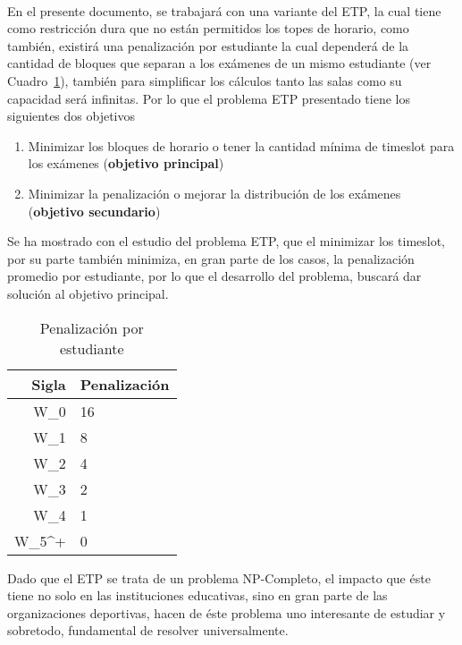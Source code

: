 \documentclass[letter, 10pt]{article}
\begin{document}
\begin{itemize}
\end{itemize}
\\
En el presente documento, se trabajará con una variante del ETP, la cual tiene como restricción dura que no están permitidos los topes de horario, como también, existirá una penalización por estudiante la cual dependerá de la cantidad de bloques que separan a los exámenes de un mismo estudiante (ver Cuadro~\ref{tab:Penalizaciones}), también para simplificar los cálculos tanto las salas como su capacidad será infinitas. Por lo que el problema ETP presentado tiene los siguientes dos objetivos
\begin{center}
    \begin{enumerate}
    \item Minimizar los bloques de horario o tener la cantidad mínima de timeslot para los exámenes (\textbf{objetivo principal})
    \item Minimizar la penalización o mejorar la distribución de los exámenes (\textbf{objetivo secundario})
\end{enumerate}
\end{center}

Se ha mostrado con el estudio del problema ETP, que el minimizar los timeslot, por su parte también minimiza, en gran parte de los casos, la penalización promedio por estudiante, por lo que el desarrollo del problema, buscará dar solución al objetivo principal.

\begin{table}[]
    \begin{center}
        \begin{tabular}{| r | l| }
        \hline
        \textbf{Sigla} & \textbf{Penalización} \\ \hline \hline
        W_0 & 16  \\ \hline
        W_1 & 8  \\ \hline
        W_2 & 4  \\ \hline
        W_3 & 2  \\ \hline
        W_4 & 1  \\ \hline
        W_5^+ & 0  \\ \hline
        \end{tabular}
        \caption{Penalización por estudiante \cite{Cita1}}
        \label{tab:Penalizaciones}
    \end{center}
\end{table}

\vspace{2mm}
Dado que el ETP se trata de un problema NP-Completo, el impacto que éste tiene no solo en las instituciones educativas, sino en gran parte de las organizaciones deportivas, hacen de éste problema uno interesante de estudiar y sobretodo, fundamental de resolver universalmente.
\end{document}
